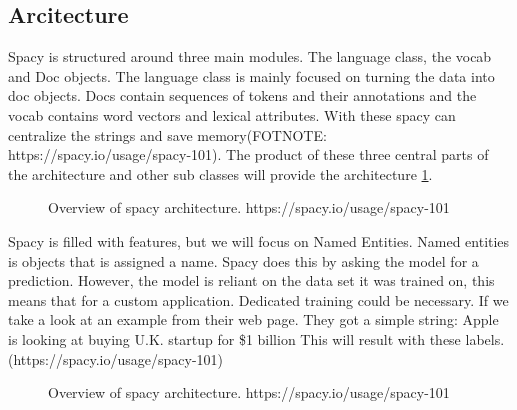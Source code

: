 \subsection{Arcitecture}\label{sec:architecture}


Spacy is structured around three main modules.
The language class, the vocab and Doc objects.
The language class is mainly focused on turning the data into doc objects.
Docs contain sequences of tokens and their annotations and the vocab contains word vectors and lexical attributes.
With these spacy can centralize the strings and save memory(FOTNOTE: https://spacy.io/usage/spacy-101).
The product of these three central parts of the architecture and other sub classes will provide the architecture \ref{fig:architecture}.


\begin{figure}[h]
    \caption{Overview of spacy architecture. https://spacy.io/usage/spacy-101}
    \label{fig:architecture}
\end{figure}

Spacy is filled with features, but we will focus on Named Entities.
Named entities is objects that is assigned a name.
Spacy does this by asking the model for a prediction.
However, the model is reliant on the data set it was trained on, this means that for a custom application.
Dedicated training could be necessary.
If we take a look at an example from their web page.
They got a simple string: Apple is looking at buying U.K. startup for \$1 billion
This will result with these labels. (https://spacy.io/usage/spacy-101)

\begin{figure}[h]
    \caption{Overview of spacy architecture. https://spacy.io/usage/spacy-101}
    \label{fig:label image}
\end{figure}

